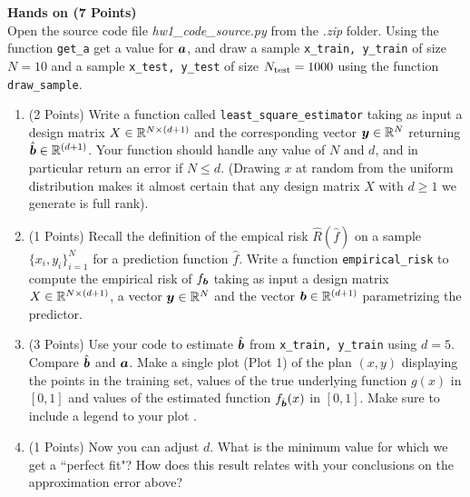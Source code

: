 \documentclass{article}
\newcommand{\bb}{b}
\begin{document}
\textbf{\color{nyupurple} Hands on (7 Points)}\\
Open the source code file \emph{hw1\_code\_source.py} from the \emph{.zip} folder. Using the function \texttt{get\_a}  get a value for $\boldsymbol{a}$, and draw a sample \texttt{x\_train, y\_train} of size $N=10$ and a sample \texttt{x\_test, y\_test} of size $N_{\rm test}=1000$ using the function \texttt{draw\_sample}.

\begin{enumerate}
\setcounter{enumi}{\value{saveenum}}
    \item (2 Points) Write a function called \texttt{least\_square\_estimator} taking as input a design matrix $X \in {\mathbb{R}}^{N \times (d + 1)}$ and the corresponding vector  $\boldsymbol{y} \in {\mathbb{R}}^N$ returning $\hat{\boldsymbol{b}} \in {\mathbb{R}}^{(d + 1)}$. Your function should handle any value of $N$ and $d$, and in particular return an error if $N \leq d$. (Drawing $x$ at random from the uniform distribution makes it almost certain that any design matrix $X$ with $d \geq 1$ we generate is full rank).
    
    \item (1 Points) Recall the definition of the empical risk $\hat{R}(\hat{f})$ on a sample $\{x_i, y_i\}_{i=1}^N$ for a prediction function $\hat{f}$. Write a function \texttt{empirical\_risk} to compute the empirical risk of $f_{\bs \bb}$ taking as input a design matrix $X \in {\mathbb{R}}^{N \times (d + 1)}$, a vector $\boldsymbol{y} \in {\mathbb{R}}^N$ and the vector  $\bs \bb \in \sR^{(d+1)}$ parametrizing the predictor.
    
    \item (3 Points) Use your code to estimate $\hat{\bs \bb}$ from \texttt{x\_train, y\_train} using $d=5$. Compare $\hat{\boldsymbol{b}}$ and $\boldsymbol{a}$. Make a single plot (Plot 1) of the plan $(x,y)$ displaying the points in the training set, values of the true underlying function $g(x)$ in $[0,1]$ and values of the estimated function $f_{\hat{\bs \bb}}(x)$ in $[0,1]$. Make sure to include a legend to your plot .
    
    \item (1 Points) Now you can adjust $d$. What is the minimum value for which we get a ``perfect fit"? How does this result relates with your conclusions on the approximation error above? 
    
\setcounter{saveenum}{\value{enumi}}    
\end{enumerate}    
\end{document}
